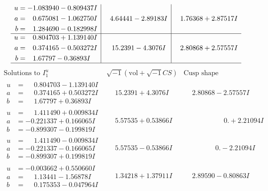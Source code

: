 \documentclass[1p]{elsarticle_modified}
\theoremstyle{definition}
\newcommand{\I}{\sqrt{-1}}
\begin{document}
$$\begin{array}{c|c|c}
\begin{aligned}
u &= -1.083940 - 0.809437 I \\
a &= \phantom{-}0.675081 - 1.062750 I \\
b &= \phantom{-}1.284690 - 0.182998 I\end{aligned}
 & \phantom{-}4.64441 - 2.89183 I & \phantom{-}1.76368 + 2.87517 I \\ \hline\begin{aligned}
u &= \phantom{-}0.804703 + 1.139140 I \\
a &= \phantom{-}0.374165 - 0.503272 I \\
b &= \phantom{-}1.67797 - 0.36893 I\end{aligned}
 & \phantom{-}15.2391 - 4.3076 I & \phantom{-}2.80868 + 2.57557 I\\
 \hline 
 \end{array}$$\newpage$$\begin{array}{c|c|c}  
\text{Solutions to }I^u_{1}& \I (\text{vol} + \sqrt{-1}CS) & \text{Cusp shape}\\
 \hline 
\begin{aligned}
u &= \phantom{-}0.804703 - 1.139140 I \\
a &= \phantom{-}0.374165 + 0.503272 I \\
b &= \phantom{-}1.67797 + 0.36893 I\end{aligned}
 & \phantom{-}15.2391 + 4.3076 I & \phantom{-}2.80868 - 2.57557 I \\ \hline\begin{aligned}
u &= \phantom{-}1.411490 + 0.009834 I \\
a &= -0.221337 + 0.166065 I \\
b &= -0.899307 - 0.199819 I\end{aligned}
 & \phantom{-}5.57535 + 0.53866 I & \phantom{-0.000000 -}0. + 2.21094 I \\ \hline\begin{aligned}
u &= \phantom{-}1.411490 - 0.009834 I \\
a &= -0.221337 - 0.166065 I \\
b &= -0.899307 + 0.199819 I\end{aligned}
 & \phantom{-}5.57535 - 0.53866 I & \phantom{-0.000000 } 0. - 2.21094 I \\ \hline\begin{aligned}
u &= -0.003662 + 0.550660 I \\
a &= \phantom{-}1.13441 - 1.56878 I \\
b &= \phantom{-}0.175353 - 0.047964 I\end{aligned}
 & \phantom{-}1.34218 + 1.37911 I & \phantom{-}2.89590 - 0.80863 I \\ \hline\begin{aligned}

\end{aligned}
\end{array}$$
\end{document}
